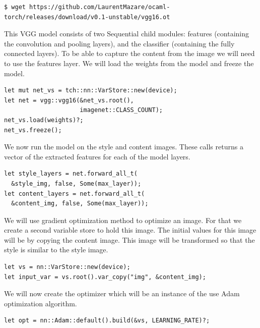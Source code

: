 \documentclass{book}
\begin{document}
\begin{lstlisting}[caption={}, basicstyle=\small]
$ wget https://github.com/LaurentMazare/ocaml-torch/releases/download/v0.1-unstable/vgg16.ot
\end{lstlisting}

This VGG model consists of two Sequential child modules: features (containing the convolution and pooling layers), and the classifier (containing the fully connected layers). To be able to capture the content from the image we will need to use the features layer. We will load the weights from the model and freeze the model.

\begin{lstlisting}[caption={https://github.com/LaurentMazare/tch-rs/blob/master/examples/neural-style-transfer/main.rs}, basicstyle=\small]
let mut net_vs = tch::nn::VarStore::new(device);
let net = vgg::vgg16(&net_vs.root(),
                     imagenet::CLASS_COUNT);
net_vs.load(weights)?;
net_vs.freeze();
\end{lstlisting}

We now run the model on the style and content images. These calls returns a vector of the extracted features for each of the model layers.

\begin{lstlisting}[caption={https://github.com/LaurentMazare/tch-rs/blob/master/examples/neural-style-transfer/main.rs}, basicstyle=\small]
let style_layers = net.forward_all_t(
  &style_img, false, Some(max_layer));
let content_layers = net.forward_all_t(
  &content_img, false, Some(max_layer));
\end{lstlisting}

We will use gradient optimization method to optimize an image. For that we create a second variable store to hold this image. The initial values for this image will be by copying the content image. This image will be transformed so that the style is similar to the style image.

\begin{lstlisting}[caption={}, basicstyle=\small]
let vs = nn::VarStore::new(device);
let input_var = vs.root().var_copy("img", &content_img);
\end{lstlisting}

We will now create the optimizer which will be an instance of the use Adam optimization algorithm.

\begin{lstlisting}[caption={}, basicstyle=\small]
let opt = nn::Adam::default().build(&vs, LEARNING_RATE)?;
\end{lstlisting}
\end{document}
